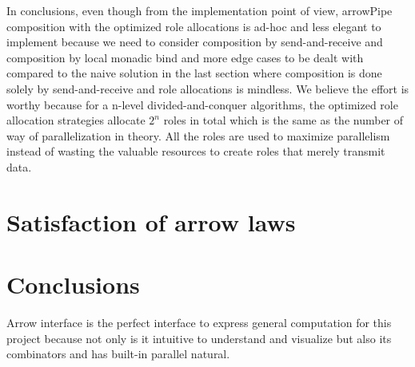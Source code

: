 In conclusions, even though from the implementation point of view, arrowPipe composition with the optimized role allocations is ad-hoc and less elegant to implement because we need to consider composition by send-and-receive and composition by local monadic bind and more edge cases to be dealt with compared to the naive solution in the last section where composition is done solely by send-and-receive and role allocations is mindless. We believe the effort is worthy because for a n-level divided-and-conquer algorithms, the optimized role allocation strategies allocate $2^n$ roles in total which is the same as the number of way of parallelization in theory. All the roles are used to maximize parallelism instead of wasting the valuable resources to create roles that merely transmit data.
\section{Satisfaction of arrow laws}
\section{Conclusions}
Arrow interface is the perfect interface to express general computation for this project because not only is it intuitive to understand and visualize but also its combinators \hask{***} and \hask{&&&} has built-in parallel natural.

